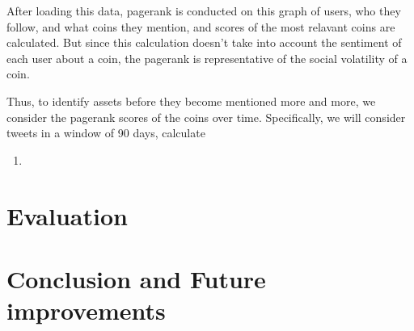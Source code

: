 \documentclass{article}
\begin{document}
After loading this data, pagerank is conducted on this graph of users, who they follow, and what coins they mention, and scores of the most relavant coins are calculated. But since this calculation doesn't take into account the sentiment of each user about a coin, the pagerank is representative of the social volatility of a coin.

Thus, to identify assets before they become mentioned more and more, we consider the pagerank scores of the coins over time. Specifically, we will consider tweets in a window of 90 days, calculate 

\begin{enumerate}
    \item 
\end{enumerate}


\section{Evaluation}



\section{Conclusion and Future improvements}
\end{document}
